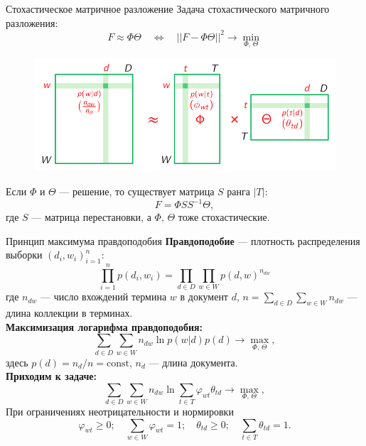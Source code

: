 \documentclass{beamer}
\begin{document}
\begin{frame}{Стохастическое матричное разложение}
Задача стохастического матричного разложения:
\begin{equation*}
    F \approx \Phi\Theta \quad \Leftrightarrow \quad ||F - \Phi\Theta||^{2} \rightarrow  \min\limits_{\Phi,\,\Theta}
\end{equation*}
\begin{figure}
   \begin{center}
   \includegraphics[scale = 0.4]{matrix.png}
   \end{center}
\end{figure}
Если $\Phi$ и $\Theta$ --- решение, то существует матрица $S$ ранга $|T|$: 
\begin{equation*}
    F = \Phi SS^{-1} \Theta,
\end{equation*}
где $S$ --- матрица перестановки, а $\Phi,\, \Theta$ тоже стохастические.
\end{frame}

\begin{frame}{Принцип максимума правдоподобия}
\small
\textbf{Правдоподобие} --- плотность распределения выборки $(d_i, w_i)_{i=1}^n$: 
\begin{equation*}
    \prod\limits_{i=1}^{n}p(d_i, w_i) = \prod\limits_{d \in D}\prod\limits_{w \in W}p(d, w)^{n_{dw}}
\end{equation*}
где $n_{dw}$ --- число вхождений термина $w$ в документ $d$, $n = \sum\limits_{d \in D}\sum\limits_{w \in W}n_{dw}$ --- длина коллекции в терминах.\\
\vspace{4\ex}
\textbf{Максимизация логарифма правдоподобия:}
\begin{equation*}
     \sum\limits_{d \in D}\sum\limits_{w \in W}n_{dw}\ln p(w|d)p(d) \rightarrow \max\limits_{\Phi,\,\Theta},
\end{equation*}
здесь $p(d) = n_d/n = \text{const}$, $n_d$ --- длина документа.\\
\vspace{4\ex}
\textbf{Приходим к задаче:}
\begin{equation*}
     \sum\limits_{d \in D}\sum\limits_{w \in W}n_{dw}\ln \sum\limits_{t \in T}\varphi_{wt}\theta_{td} \rightarrow \max\limits_{\Phi,\,\Theta},
\end{equation*}
При ограничениях неотрицательности и нормировки
\begin{equation*}
     \varphi_{wt} \geq 0; \quad \sum\limits_{w\in W}\varphi_{wt} = 1; \quad \theta_{td}\geq 0; \quad \sum\limits_{t\in T}\theta_{td} = 1.
\end{equation*}
\end{frame}
\end{document}
